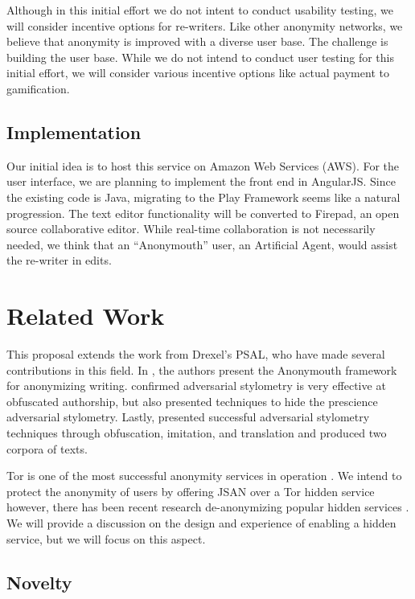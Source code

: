 \documentclass[letterpaper]{article}
\begin{document}
Although in this initial effort we do not intent to conduct usability
testing, we will consider incentive options for re-writers.  Like
other anonymity networks, we believe that anonymity is improved with a
diverse user base.  The challenge is building the user base.  While we
do not intend to conduct user testing for this initial effort, we will
consider various incentive options like actual payment to
gamification.

\subsection{Implementation}

Our initial idea is to host this service on Amazon Web Services
(AWS).  For the user interface, we are planning to implement the front
end in AngularJS.  Since the existing code is Java, migrating to the
Play Framework seems like a natural progression.  The text editor
functionality will be converted to Firepad, an open source
collaborative editor.  While real-time collaboration is not
necessarily needed, we think that an ``Anonymouth'' user, an
Artificial Agent, would assist the re-writer in edits.


\section*{Related Work}\label{sec:related}
This proposal extends the work from Drexel's PSAL, who have made
several contributions in this field.  In
\cite{conf/pet/McDonaldACSG12}, the authors present the Anonymouth
framework for anonymizing writing.
\cite{Afroz:2012:DHF:2310656.2310711} confirmed adversarial stylometry
is very effective at obfuscated authorship, but also presented
techniques to hide the prescience adversarial stylometry.  Lastly,
\cite{journals/tissec/BrennanAG12} presented successful adversarial
stylometry techniques through obfuscation, imitation, and translation
and produced two corpora of texts.

Tor is one of the most successful anonymity services in
operation \cite{Dingledine04tor:the}.  We intend to protect the
anonymity of users by offering JSAN over a Tor hidden service
however, there has been recent research de-anonymizing popular hidden
services \cite{oakland2013-trawling}.  We will provide a discussion on
the design and experience of enabling a hidden service, but we will
focus on this aspect.

\subsection{Novelty}\label{sec:novelty}
\end{document}
